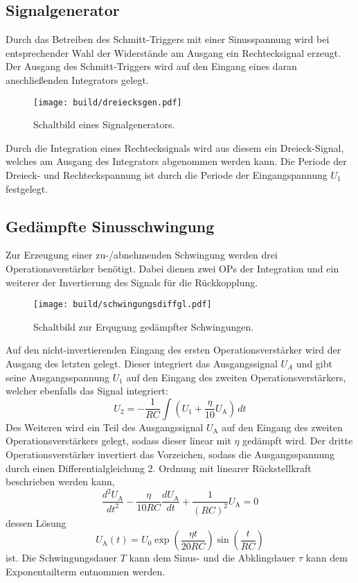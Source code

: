 \subsection{Signalgenerator}%
\label{sub:signalgenerator}
Durch das Betreiben des Schmitt-Triggers mit einer Sinusspannung wird bei
entsprechender Wahl der Widerstände am Ausgang ein Rechtecksignal erzeugt.
Der Ausgang des Schmitt-Triggers wird auf den Eingang eines daran anschließenden
Integrators gelegt.
\begin{figure}[h]
		\centering
		\texttt{[image: build/dreiecksgen.pdf]}
		\caption{Schaltbild eines Signalgenerators. \cite{anleitung}}
		\label{fig:}
\end{figure}
Durch die Integration eines Rechtecksignals wird aus diesem ein Dreieck-Signal,
welches am Ausgang des Integrators abgenommen werden kann.
Die Periode der Dreieck- und Rechteckspannung ist durch die Periode der
Eingangspannung $U_1$ festgelegt.

\subsection{Gedämpfte Sinusschwingung}%
\label{sub:gedaempfte_sinusschwingung}
Zur Erzeugung einer zu-/abnehmenden Schwingung werden drei Operationsverstärker
benötigt.
Dabei dienen zwei OPs der Integration und ein weiterer der Invertierung
des Signals für die Rückkopplung.
\begin{figure}[h]
		\centering
		\texttt{[image: build/schwingungsdiffgl.pdf]}
		\caption{Schaltbild zur Erqugung gedämpfter Schwingungen. \cite{anleitung}}
		\label{fig:}
\end{figure}

Auf den nicht-invertierenden Eingang des ersten Operationsverstärker wird der
Ausgang des letzten gelegt.
Dieser integriert das Ausgangssignal $U_A$ und gibt seine Ausgangsspannung $U_1$ auf
den Eingang des zweiten Operationsverstärkers, welcher ebenfalls das Signal
integriert:
\begin{equation}
		\label{eq:ov2}
		U_2 = - \frac{1}{RC} \int \left( U_1 + \frac{\eta}{10} U_\text{A} \right) \, dt
\end{equation}
Des Weiteren wird ein Teil des Ausgangssignal $U_\text{A}$ auf den Eingang des
zweiten Operationsverstärkers gelegt, sodass dieser linear mit $\eta$ gedämpft wird.
Der dritte Operationsverstärker invertiert das Vorzeichen, sodass die
Ausgangsspannung durch einen Differentialgleichung 2. Ordnung mit linearer
Rückstellkraft beschrieben werden kann,
\begin{equation}
		\label{eq:schwingung_diff}
		\frac{d^2 U_\text{A}}{dt^2} - \frac{\eta}{10 R C} \frac{d
		U_\text{A}}{dt} + \frac{1}{(RC)^2} U_\text{A} = 0
\end{equation}
dessen Lösung
\begin{equation}
		U_\text{A}(t) = U_0 \exp \left( \frac{\eta t}{20 RC} \right)
    \sin \left(\frac{t}{RC}\right) \label{eq:tau}
\end{equation}
ist.
Die Schwingungsdauer $T$ kann dem Sinus- und die Abklingdauer $\tau$ kann dem
Exponentailterm entnommen werden.
